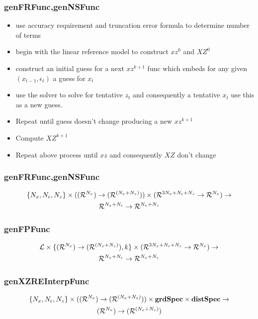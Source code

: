 \documentclass[tikz]{beamer}
\begin{document}
\begin{frame}
\frametitle{genFRFunc,genNSFunc}
\label{sec:genfrfunc}
  \begin{itemize}
  \item use accuracy requirement and truncation error formula to determine number of terms
  \item begin with the linear reference model to construct $xz^0$ and $XZ^0$
  \item construct an initial guess for a next $xz^{k+1}$ func which embeds
for any given $(x_{t-1},\epsilon_t)$ a guess for $x_t$ 
  \item use the solver to solve for tentative $z_t$ and consequently 
a tentative $x_t$ use this as a new guess.  
\item Repeat until guess doesn't change producing  a new $xz^{k+1}$
\item Compute $XZ^{k+1}$
\item Repeat above process until $xz$ and consequently $XZ$ don't change
  \end{itemize}
\end{frame}


\begin{frame}
\frametitle{genFRFunc,genNSFunc}
\begin{gather*}
\{{N_x},{N_\epsilon},{N_z}\}\times({({\mathcal{R}^{{N_x}}})\rightarrow ({\mathcal{R}^{({{N_x}+{N_z}})}})})\times ({{\mathcal{R}^{3{N_x}+{N_\epsilon}+{N_z}}}\rightarrow{\mathcal{R}^{{N_x}}}})    \rightarrow\\
{{\mathcal{R}^{{N_x}+{N_\epsilon}}}\rightarrow{\mathcal{R}^{{N_x}+{N_z}}}}
\end{gather*}
\end{frame}

\begin{frame}
\frametitle{genFPFunc}
\label{sec:genfpfunc}
\begin{gather*}
{\mathcal{L}} \times \{  {({\mathcal{R}^{{N_x}}})\rightarrow ({\mathcal{R}^{({{N_x}+{N_z}})}})}, k \} \times ({{\mathcal{R}^{3{N_x}+{N_\epsilon}+{N_z}}}\rightarrow{\mathcal{R}^{{N_x}}}})    \rightarrow\\ 
{{\mathcal{R}^{{N_x}+{N_\epsilon}}}\rightarrow{\mathcal{R}^{{N_x}+{N_z}}}}
\end{gather*}

\end{frame}


\begin{frame}
\frametitle{genXZREInterpFunc}
\label{sec:genfpfunc}
\begin{gather*}
\{{N_x},{N_\epsilon},{N_z}\}\times({({\mathcal{R}^{{N_x}}})\rightarrow ({\mathcal{R}^{({{N_x}+{N_z}})}})})\times {\mathbf{grdSpec}} \times  {\mathbf{distSpec}}   \rightarrow\\
{({\mathcal{R}^{{N_x}}})\rightarrow ({\mathcal{R}^{({{N_x}+{N_z}})}})}
\end{gather*}



\end{frame}
\end{document}

